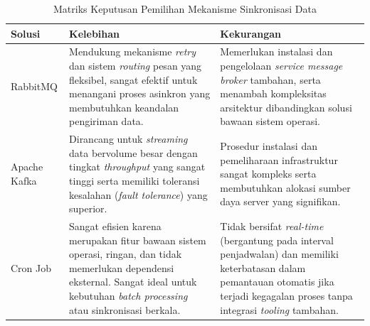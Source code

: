 \begin{table}[htbp]
    \centering
    \caption{Matriks Keputusan Pemilihan Mekanisme Sinkronisasi Data}
    \label{tab:matriks_sync_engine}
    \begin{tabularx}{\textwidth}{|l|X|X|}
        \hline
        \textbf{Solusi} & \textbf{Kelebihan} & \textbf{Kekurangan} \\
        \hline
        RabbitMQ & Mendukung mekanisme \textit{retry} dan sistem \textit{routing} pesan yang fleksibel, sangat efektif untuk menangani proses asinkron yang membutuhkan keandalan pengiriman data. & Memerlukan instalasi dan pengelolaan \textit{service message broker} tambahan, serta menambah kompleksitas arsitektur dibandingkan solusi bawaan sistem operasi. \\
        \hline
        Apache Kafka & Dirancang untuk \textit{streaming} data bervolume besar dengan tingkat \textit{throughput} yang sangat tinggi serta memiliki toleransi kesalahan (\textit{fault tolerance}) yang superior. & Prosedur instalasi dan pemeliharaan infrastruktur sangat kompleks serta membutuhkan alokasi sumber daya server yang signifikan. \\
        \hline
        Cron Job & Sangat efisien karena merupakan fitur bawaan sistem operasi, ringan, dan tidak memerlukan dependensi eksternal. Sangat ideal untuk kebutuhan \textit{batch processing} atau sinkronisasi berkala. & Tidak bersifat \textit{real-time} (bergantung pada interval penjadwalan) dan memiliki keterbatasan dalam pemantauan otomatis jika terjadi kegagalan proses tanpa integrasi \textit{tooling} tambahan. \\
        \hline
    \end{tabularx}
\end{table}